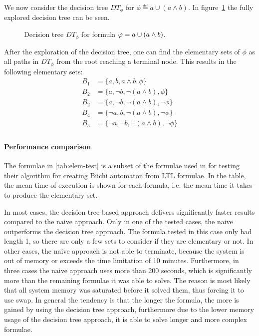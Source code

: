 \begin{example}
We now consider the decision tree $DT_\phi$ for $\phi \eqdef a \cup (a \land b)$. In figure~\ref{fig:elemset} the fully explored decision tree can be seen.

\begin{figure}[!ht]
\begin{center}
    
    \caption{Decision tree $DT_\phi$ for formula $\varphi = a \cup (a \land b)$.}
    \label{fig:elemset}
\end{center}
\end{figure}

After the exploration of the decision tree, one can find the elementary sets of $\phi$ as all paths in $DT_\phi$ from the root reaching a terminal node. This results in the following elementary sets:
\begin{align*}
    B_1 &= \{a,         b,         a\land b,           \phi\} \\
    B_2 &= \{a,         \lnot b,    \lnot (a\land b),   \phi\} \\
    B_2 &= \{a,         \lnot b,    \lnot (a\land b),   \lnot \phi\} \\
    B_4 &= \{\lnot a,   b,         \lnot (a\land b),  \lnot \phi\} \\
    B_5 &= \{\lnot a,   \lnot b,    \lnot (a\land b),   \lnot \phi\} \\
\end{align*}
\end{example}

\paragraph{Performance comparison}
The formulae in \autoref{tab:elem-test} is a subset of the formulae used in \cite[Tab.~1]{somenzi2000efficient} for testing their algorithm for creating Büchi automaton from LTL formulae. In the table, the mean time of execution is shown for each formula, i.e. the mean time it takes to produce the elementary set.



In most cases, the decision tree-based approach delivers significantly faster results compared to the naive approach. Only in one of the tested cases, the naive outperforms the decision tree approach. The formula tested in this case only had length 1, so there are only a few sets to consider if they are elementary or not. In other cases, the naive approach is not able to terminate, because the system is out of memory or exceeds the time limitation of 10 minutes. Furthermore, in three cases the naive approach uses more than 200 seconds, which is significantly more than the remaining formulae it was able to solve. The reason is most likely that all system memory was saturated before it solved them, thus forcing it to use swap. In general the tendency is that the longer the formula, the more is gained by using the decision tree approach, furthermore due to the lower memory usage of the decision tree approach, it is able to solve longer and more complex formulae.

